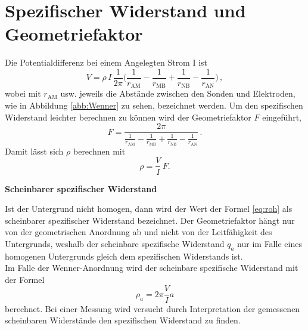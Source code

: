 \section{Spezifischer Widerstand und Geometriefaktor}

Die Potentialdifferenz bei einem Angelegten Strom I ist
\begin{equation}
V = \rho \, I \, \frac{1}{2 \pi} \big(\frac{1}{r_{\mathrm{AM}}} - \frac{1}{r_{\mathrm{MB}}} + \frac{1}{r_{\mathrm{NB}}} - \frac{1}{r_{\mathrm{AN}}} \big) \, ,
\end{equation}
wobei mit $r_{\mathrm{AM}}$ usw. jeweils die Abstände zwischen den Sonden und Elektroden, wie in Abbildung \ref{abb:Wenner} zu sehen, bezeichnet werden.
Um den spezifischen Widerstand leichter berechnen zu können wird der Geometriefaktor $F$ eingeführt,
$$F = \frac{2 \pi}{\frac{1}{r_{\mathrm{AM}}} - \frac{1}{r_{\mathrm{MB}}} + \frac{1}{r_{\mathrm{NB}}} - \frac{1}{r_{\mathrm{AN}}}}\,.$$
Damit lässt sich $\rho$ berechnen mit 
\begin{equation}
\rho = \frac{V}{I} \, F.
\end{equation} \label{eq:roh}

\textbf{Scheinbarer spezifischer Widerstand}

Ist der Untergrund nicht homogen, dann wird der Wert der Formel \ref{eq:roh} als scheinbarer spezifischer Widerstand bezeichnet. Der Geometriefaktor hängt nur von der geometrischen Anordnung ab und nicht von der 
Leitfähigkeit des Untergrunds, weshalb der scheinbare spezifische Widerstand $q_a$ nur im Falle eines homogenen Untergrunds gleich dem spezifischen Widerstands ist.\\
Im Falle der Wenner-Anordnung wird  der scheinbare spezifische Widerstand mit der Formel
$$ \rho_a = 2 \pi \frac{V}{I} a $$
berechnet.
Bei einer Messung wird versucht durch Interpretation der gemessenen scheinbaren Widerstände den spezifischen Widerstand zu finden.











